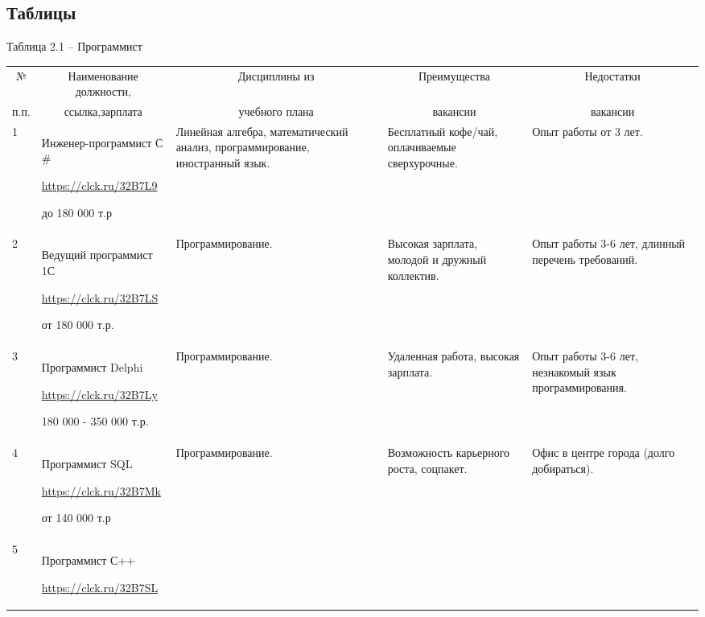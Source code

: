\begin{landscape}
\section{Таблицы}
\vspace{5mm}
Таблица 2.1 – Программист
\begin{table}[H]
	\begin{center}
		\begin{small}
		\begin{tabular}{|p{1.1cm}|p{6cm}|p{5.2cm}|p{4cm}|p{4cm}|} \hline
			\multicolumn{1}{|c|}{№}&\multicolumn{1}{c|}{Наименование должности,}&\multicolumn{1}{c|}{Дисциплины из}&\multicolumn{1}{c|}{Преимущества }&\multicolumn{1}{c|}{Недостатки}\\ 
			\multicolumn{1}{|c|}{п.п.}&\multicolumn{1}{c|}{ссылка,зарплата}&\multicolumn{1}{c|}{учебного плана}&\multicolumn{1}{c|}{ вакансии}&\multicolumn{1}{c|}{вакансии}\\ 
			\hline
			1 & Инженер-программист С$\#$
			
			\url{https://clck.ru/32B7L9}
			
			до 180 000 т.р & Линейная алгебра, математический анализ, программирование, иностранный язык.& Бесплатный кофе/чай, оплачиваемые сверхурочные.& Опыт работы от 3 лет.\\
			\hline
			2 & Ведущий программист 1С
			
			\url{https://clck.ru/32B7LS}
			
			от 180 000 т.р. & Программирование.& Высокая зарплата, молодой и дружный коллектив.& Опыт работы 3-6 лет, длинный перечень требований.\\
			\hline
                3 & Программист Delphi
			
			\url{https://clck.ru/32B7Ly}
			
			180 000 - 350 000 т.р. & Программирование.& Удаленная работа, высокая зарплата.& Опыт работы 3-6 лет, незнакомый язык программирования.\\
			\hline
			4 & Программист SQL
			
			\url{https://clck.ru/32B7Mk}
			
			от 140 000 т.р & Программирование.& Возможность карьерного роста, соцпакет.& Офис в центре города (долго добираться).\\
			\hline
			5 & Программист С++
			
			\url{https://clck.ru/32B7SL}
			

\end{tabular}
\end{small}
\end{center}
\end{table}
\end{landscape}
